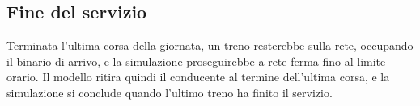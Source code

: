 \subsection{Fine del servizio}
Terminata l'ultima corsa della giornata, un treno resterebbe sulla rete, occupando il binario di arrivo, e la simulazione proseguirebbe a rete ferma fino al limite orario. Il modello ritira quindi il conducente al termine dell'ultima corsa, e la simulazione si conclude quando l'ultimo treno ha finito il servizio.
